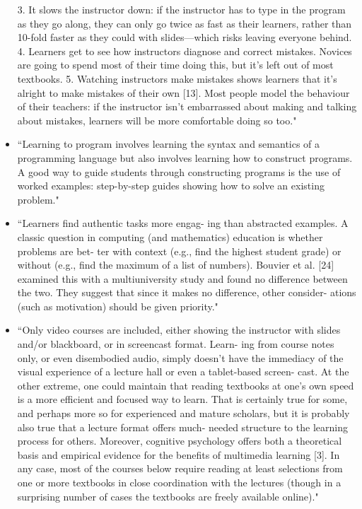 \documentclass[pdftex,english,11pt,parskip=half]{scrartcl}
\begin{document}
\begin{itemize}
3. It slows the instructor down: if the instructor has to type in the program as they go along, they can only go twice as fast as their learners, rather than 10-fold faster as they could with slides—which risks leaving everyone behind. 4. Learners get to see how instructors diagnose and correct mistakes. Novices are going to spend most of their time doing this, but it’s left out of most textbooks.
5. Watching instructors make mistakes shows learners that it’s alright to make mistakes of their own [13]. Most people model the behaviour of their teachers: if the instructor isn’t embarrassed about making and talking about mistakes, learners will be more comfortable doing so too." \cite{brown2018ten}
\item ``Learning to program involves learning the syntax and semantics of a programming language but also involves learning how to construct programs. A good way to guide students through constructing programs is the use of worked examples: step-by-step guides showing how to solve an existing problem." \cite{brown2018ten}
\item ``Learners find authentic tasks more engag- ing than abstracted examples.
A classic question in computing (and mathematics) education is whether problems are bet- ter with context (e.g., find the highest student grade) or without (e.g., find the maximum of a list of numbers). Bouvier et al. [24] examined this with a multiuniversity study and found no difference between the two. They suggest that since it makes no difference, other consider- ations (such as motivation) should be given priority." \cite{brown2018ten}
\item ``Only video courses are included, either showing the instructor with slides and/or blackboard, or in screencast format. Learn- ing from course notes only, or even disembodied audio, simply doesn’t have the immediacy of the visual experience of a lecture hall or even a tablet-based screen- cast. At the other extreme, one could maintain that reading textbooks at one’s own speed is a more efficient and focused way to learn. That is certainly true for some, and perhaps more so for experienced and mature scholars, but it is probably also true that a lecture format offers much- needed structure to the learning process for others. Moreover, cognitive psychology offers both a theoretical basis and empirical evidence for the benefits of multimedia learning [3]. In any case, most of the courses below require reading at least selections from one or more textbooks in close coordination with the lectures (though in a surprising number of cases the textbooks are freely available online)." \cite{searls2012online}

\end{itemize}
\end{document}
